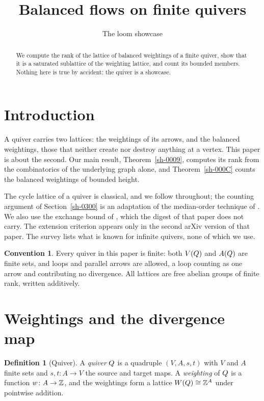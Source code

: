 \documentclass[11pt]{amsart}
\title{Balanced flows on finite quivers}
\author{The loom showcase}
\theoremstyle{plain}
\theoremstyle{definition}
\newtheorem{definition}[theorem]{Definition}
\newtheorem{convention}[theorem]{Convention}
\theoremstyle{remark}
\begin{document}
\maketitle

\begin{abstract}
We compute the rank of the lattice of balanced weightings of a finite quiver, show that it is a saturated sublattice of the weighting lattice, and count its bounded members. Nothing here is true by accident: the quiver is a showcase.
\end{abstract}

\section{Introduction}\label{sh-0100}

A quiver carries two lattices: the weightings of its arrows, and the balanced weightings, those that neither create nor destroy anything at a vertex. This paper is about the second. Our main result, Theorem~\ref{sh-0009}, computes its rank from the combinatorics of the underlying graph alone, and Theorem~\ref{sh-000C} counts the balanced weightings of bounded height.

The cycle lattice of a quiver is classical, and we follow \cite[Proposition 2.1]{Arden24} throughout; the counting argument of Section~\ref{sh-0300} is an adaptation of the median-order technique of \cite[Theorem 2.3]{Bellamy19}. We also use the exchange bound of \cite[Lemma 5.9]{Arden24}, which the digest of that paper does not carry. The extension criterion \cite[Theorem 5.1]{Arden24} appears only in the second arXiv version of that paper. The survey \cite{Cortez07} lists what is known for infinite quivers, none of which we use.

\begin{convention}\label{sh-0001}
Every quiver in this paper is finite: both $V(Q)$ and $A(Q)$ are finite sets, and loops and parallel arrows are allowed, a loop counting as one arrow and contributing no divergence. All lattices are free abelian groups of finite rank, written additively.
\end{convention}


\section{Weightings and the divergence map}\label{sh-0200}

\begin{definition}[Quiver]\label{sh-0002}
A \emph{quiver} $Q$ is a quadruple $(V, A, s, t)$ with $V$ and $A$ finite sets and $s, t \colon A \to V$ the source and target maps. A \emph{weighting} of $Q$ is a function $w \colon A \to \mathbb{Z}$, and the weightings form a lattice $W(Q) \cong \mathbb{Z}^{A}$ under pointwise addition.
\end{definition}
\end{document}
